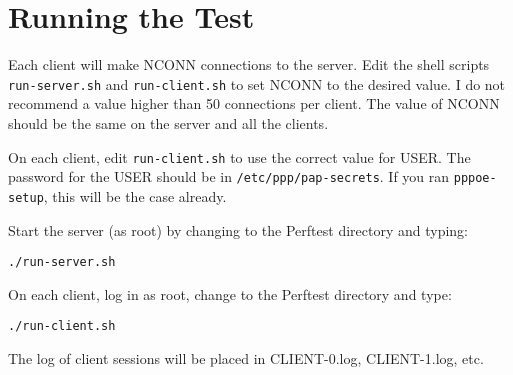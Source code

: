 \documentclass[11pt]{article}
\begin{document}
\section{Running the Test}

Each client will make NCONN connections to the server.  Edit the
shell scripts \texttt{run-server.sh} and \texttt{run-client.sh}
to set NCONN to the desired value.  I do not recommend a value
higher than 50 connections per client.  The value of NCONN should
be the same on the server and all the clients.

On each client, edit \texttt{run-client.sh} to use the correct
value for USER.  The password for the USER should be in
\texttt{/etc/ppp/pap-secrets}.  If you ran \texttt{pppoe-setup}, this
will be the case already.

Start the server (as root) by changing to the Perftest directory and
typing:
\begin{verbatim}
./run-server.sh
\end{verbatim}

On each client, log in as root, change to the Perftest directory and type:

\begin{verbatim}
./run-client.sh
\end{verbatim}

The log of client sessions will be placed in CLIENT-0.log, CLIENT-1.log, etc.
\end{document}

